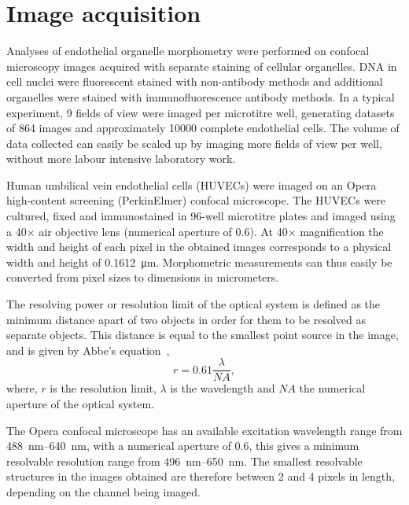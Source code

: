 \section{Image acquisition}
\label{endothelial_morphometry:image_acquisition}
Analyses of endothelial organelle morphometry were performed on confocal microscopy images acquired with separate staining of cellular organelles. DNA in cell nuclei were fluorescent stained with non-antibody methods and additional organelles were stained with immunofluorescence antibody methods. In a typical experiment, 9 fields of view were imaged per microtitre well, generating datasets of 864 images and approximately 10000 complete endothelial cells. The volume of data collected can easily be scaled up by imaging more fields of view per well, without more labour intensive laboratory work.

Human umbilical vein endothelial cells (HUVECs) were imaged on an Opera high-content screening (PerkinElmer) confocal microscope. The HUVECs were cultured, fixed and immunostained in 96-well microtitre plates and imaged using a 40$\times$ air objective lens (numerical aperture of 0.6). At 40$\times$ magnification the width and height of each pixel in the obtained images corresponds to a physical width and height of \SI{0.1612}{\micro\meter}. Morphometric measurements can thus easily be converted from pixel sizes to dimensions in micrometers.

The resolving power or resolution limit of the optical system is defined as the minimum distance apart of two objects in order for them to be resolved as separate objects. This distance is equal to the smallest point source in the image, and is given by Abbe's equation~\cite{Abbe1873},
\begin{equation}
r=0.61\frac{\lambda}{NA},
\end{equation}
where, $r$ is the resolution limit, $\lambda$ is the wavelength and $NA$ the numerical aperture of the optical system.

The Opera confocal microscope has an available excitation wavelength range from \SIrange{488}{640}{\nano\meter}, with a numerical aperture of 0.6, this gives a minimum resolvable resolution range from \SIrange{496}{650}{\nano\meter}. The smallest resolvable structures in the images obtained are therefore between 2 and 4 pixels in length, depending on the channel being imaged.

